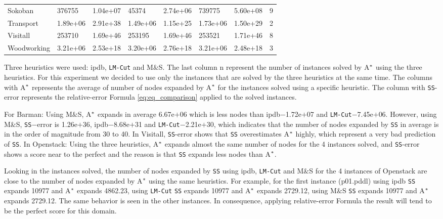 \begin{table}[!htb]
\begin{tabular}{lR{2cm}R{2cm}R{2cm}R{2cm}R{2cm}R{2cm}C{2cm}}
Sokoban              & 376755      & 1.04e+07   & 45374             & 2.74e+06          & 739775       & 5.60e+08    & 9                  \\
Transport            & 1.89e+06    & 2.91e+38   & 1.49e+06          & 1.15e+25          & 1.73e+06     & 1.50e+29    & 2                  \\
Visitall             & 253710      & 1.69e+46   & 253195            & 1.69e+46          & 253521       & 1.71e+46    & 8                  \\
Woodworking          & 3.21e+06    & 2.53e+18   & 3.20e+06          & 2.76e+18          & 3.21e+06     & 2.48e+18    & 3                  \\ \hline
\end{tabular}
\end{table}

Three heuristics were used: ipdb, \texttt{LM-Cut} and M$\&$S.  The last column \textsf{n} represent the number of instances solved by A$\sp{*}$ using the three heuristics. For this experiment we decided to use only the instances that are solved by the three heuristics at the same time. The columns with A$\sp{*}$ represents the average of number of nodes expanded by A$\sp{*}$ for the instances solved using a specific heuristic. The column with \texttt{SS}-error represents the relative-error Formula \ref{eq:eq_comparison} applied to the solved instances.

For Barman: Using M$\&$S, A$\sp{*}$ expands in average 6.67e$+$06 which is less nodes than ipdb$-$1.72e$+$07 and \texttt{LM-Cut}$-$7.45e$+$06. However, using M$\&$S, \texttt{SS}$-$error is 1.26e$+$36, ipdb$-$8.68e$+$31 and \texttt{LM-Cut}$-$2.21e$+$30, which indicates that the number of nodes expanded by \texttt{SS} in average is in the order of magnitude from 30 to 40. In Visitall, \texttt{SS}-error shows that \texttt{SS} overestimates A$\sp{*}$ highly, which represent a very bad prediction of \texttt{SS}. In Openstack: Using the three heuristics, A$\sp{*}$ expands almost the same number of nodes for the 4 instances solved, and \texttt{SS}-error shows a score near to the perfect and the reason is that \texttt{SS} expands less nodes than A$\sp{*}$. 

Looking in the instances solved, the number of nodes expanded by \texttt{SS} using ipdb, \texttt{LM-Cut} and M$\&$S for the 4 instances of Openstack are close to the number of nodes expanded by A$\sp{*}$ using the same heuristics. For example, for the first instance (p01.pddl) using ipdb \texttt{SS} expands 10977 and A$\sp{*}$ expands 4862.23, using \texttt{LM-Cut} \texttt{SS} expands 10977 and A$\sp{*}$ expands 2729.12, using M$\&$S \texttt{SS} expands 10977 and A$\sp{*}$ expands 2729.12. The same behavior is seen in the other instances. In consequence, applying relative-error Formula the result will tend to be the perfect score for this domain.

